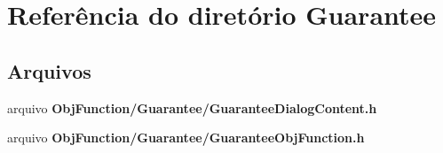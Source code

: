 \section{Referência do diretório Guarantee}
\label{dir_9abf72885a3af05f03d9bc274ff998af}
\subsection*{Arquivos}
\begin{DoxyCompactItemize}
\item 
arquivo {\bf Obj\+Function/\+Guarantee/\+Guarantee\+Dialog\+Content.\+h}
\item 
arquivo {\bf Obj\+Function/\+Guarantee/\+Guarantee\+Obj\+Function.\+h}
\end{DoxyCompactItemize}
